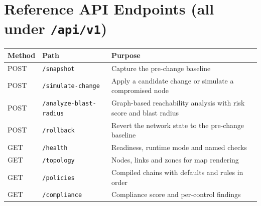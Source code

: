 \documentclass[11pt,a4paper]{article}
\begin{document}
\clearpage
\appendix
\section{Reference API Endpoints (all under \texttt{/api/v1})}
\begin{tabularx}{\linewidth}{@{} l l X @{}}
  \toprule
  \textbf{Method} & \textbf{Path} & \textbf{Purpose} \\
  \midrule
  POST & \texttt{/snapshot} & Capture the pre-change baseline \\
  POST & \texttt{/simulate-change} & Apply a candidate change or simulate a compromised node \\
  POST & \texttt{/analyze-blast-radius} & Graph-based reachability analysis with risk score and blast radius \\
  POST & \texttt{/rollback} & Revert the network state to the pre-change baseline \\
  GET & \texttt{/health} & Readiness, runtime mode and named checks \\
  GET & \texttt{/topology} & Nodes, links and zones for map rendering \\
  GET & \texttt{/policies} & Compiled chains with defaults and rules in order \\
  GET & \texttt{/compliance} & Compliance score and per-control findings \\
  \bottomrule
\end{tabularx}
\end{document}
